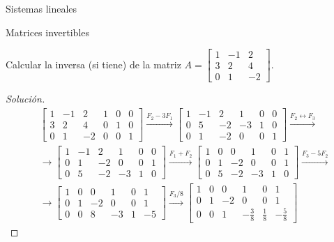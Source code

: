 \begin{chapter}{Sistemas lineales}
\begin{section}{Matrices invertibles}
            \begin{ejemplo*}
                Calcular la inversa (si tiene) de la matriz $A=\begin{bmatrix}
                1&-1&2\\ 3&2&4\\ 0&1&-2
                \end{bmatrix}$. 
            \end{ejemplo*}
            \begin{proof}[Solución]
                \begin{align*} 
                &\left[\begin{array}{rrr|rrr}	1&-1&2&1&0&0\\ 3&2&4&0&1&0\\ 0&1&-2&0&0&1 \end{array}\right]
                \stackrel{F_2-3 F_1}{\longrightarrow}
                \left[\begin{array}{rrr|rrr}	1&-1&2
                &1&0&0\\ 0&5&-2&-3&1&0\\ 0&1&-2&0&0&1 \end{array}\right]
                \stackrel{F_2\leftrightarrow F_3}{\longrightarrow} \\
                &\longrightarrow 
                \left[\begin{array}{rrr|rrr}	1&-1&2&1&0&0\\ 0&1&-2&0&0&1 \\ 0&5&-2&-3&1&0 \end{array}\right]
                \stackrel{F_1 + F_2}{\longrightarrow}
                \left[\begin{array}{rrr|rrr}	1&0&0&1&0&1\\ 0&1&-2&0&0&1 \\ 0&5&-2&-3&1&0 \end{array}\right]
                \stackrel{F_3-5F_2}{\longrightarrow} \\
                &\longrightarrow
                \left[\begin{array}{rrr|rrr}	1&0&0&1&0&1\\ 0&1&-2&0&0&1 \\ 0&0&8&-3&1&-5 \end{array}\right]
                \stackrel{F_3/8}{\longrightarrow}
                \left[\begin{array}{rrr|rrr}	1&0&0&1&0&1\\ 0&1&-2&0&0&1 \\ 0&0&1&-\frac38&\frac18&-\frac58 \end{array}\right]

\end{align*}
\end{proof}
\end{section}
\end{chapter}
